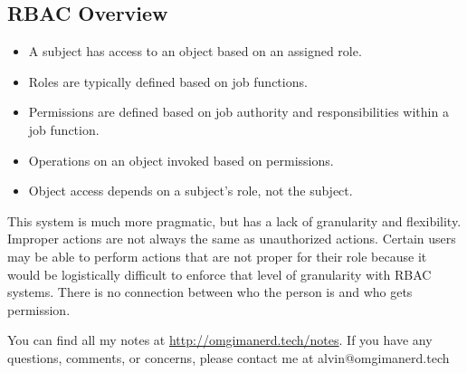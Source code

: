 \documentclass{math}
\begin{document}
\subsection*{RBAC Overview}
\begin{itemize}
  \item A subject has access to an object based on an assigned role.
  \item Roles are typically defined based on job functions.
  \item Permissions are defined based on job authority and responsibilities
  within a job function.
  \item Operations on an object invoked based on permissions.
  \item Object access depends on a subject's role, not the subject.
\end{itemize}
This system is much more pragmatic, but has a lack of granularity and
flexibility. Improper actions are not always the same as unauthorized actions.
Certain users may be able to perform actions that are not proper for their role
because it would be logistically difficult to enforce that level of granularity
with RBAC systems. There is no connection between who the person is and who gets
permission.

\begin{center}
  You can find all my notes at \url{http://omgimanerd.tech/notes}. If you have
  any questions, comments, or concerns, please contact me at
  alvin@omgimanerd.tech
\end{center}
\end{document}
